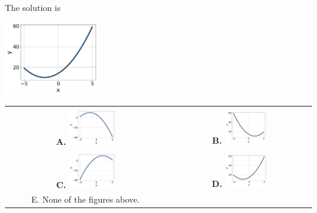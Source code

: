 \documentclass{extbook}[14pt]
\begin{document}
 
 The solution is  
 \begin{center} \includegraphics[width=0.3\textwidth]{../Figures/quadraticEquationToGraphDB.png} \end{center}\begin{tabular}{|c|c|} 
\hline 
 & \tabularnewline 
 \textbf{A.} \includegraphics[width=0.3\textwidth]{../Figures/quadraticEquationToGraphAB.png} & \textbf{B.} \includegraphics[width=0.3\textwidth]{../Figures/quadraticEquationToGraphBB.png} \tabularnewline 
\hline 
 & \tabularnewline 
 \textbf{C.} \includegraphics[width=0.3\textwidth]{../Figures/quadraticEquationToGraphCB.png} & \textbf{D.} \includegraphics[width=0.3\textwidth]{../Figures/quadraticEquationToGraphDB.png} \tabularnewline 
\hline 
 E. None of the figures above. & \tabularnewline 
\hline 
 \end{tabular} 
 
\end{document}

